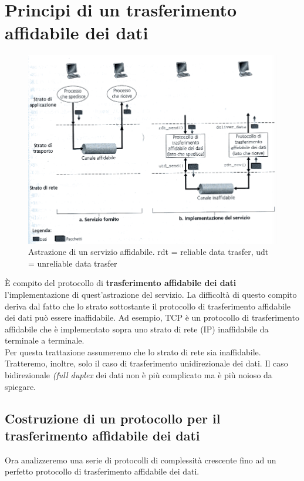 \documentclass[11pt,a4paper]{book}
\begin{document}
\section{Principi di un trasferimento affidabile dei dati}
\begin{figure}
	\includegraphics[scale=0.6]{img/016.png}
	\caption{Astrazione di un servizio affidabile. rdt = reliable data trasfer, udt = unreliable data trasfer}
\end{figure}
È compito del protocollo di \textbf{trasferimento affidabile dei dati} l'implementazione di quest'astrazione del servizio. La difficoltà di questo compito deriva dal fatto che lo strato sottostante il protocollo di trasferimento affidabile dei dati può essere inaffidabile. Ad esempio, TCP è un protocollo di trasferimento affidabile che è implementato sopra uno strato di rete (IP) inaffidabile da terminale a terminale. \\
Per questa trattazione assumeremo che lo strato di rete sia inaffidabile. Tratteremo, inoltre, solo il caso di trasferimento unidirezionale dei dati. Il caso bidirezionale \textit{(full duplex} dei dati non è più complicato ma è più noioso da spiegare. \\
\subsection{Costruzione di un protocollo per il trasferimento affidabile dei dati}
Ora analizzeremo una serie di protocolli di complessità crescente fino ad un perfetto protocollo di trasferimento affidabile dei dati.
\end{document}
